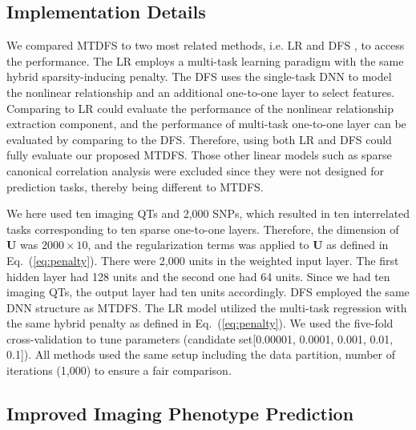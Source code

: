 \documentclass{llncs}
\begin{document}
\subsection{Implementation Details}

We compared MTDFS to two most related methods, i.e. LR \cite{wang2012bioinfo1} and DFS \cite{li2015}, to access the performance. The LR employs a multi-task learning paradigm with the same hybrid sparsity-inducing penalty. The DFS uses the single-task DNN to model the nonlinear relationship and an additional one-to-one layer to select features. Comparing to LR could evaluate the performance of the nonlinear relationship extraction component, and the performance of multi-task one-to-one layer can be evaluated by comparing to the DFS. Therefore, using both LR and DFS could fully evaluate our proposed MTDFS. Those other linear models such as sparse canonical correlation analysis \cite{du2020mia,fang2016joint,lin2013mia,yan2014eccb} were excluded since they were not designed for prediction tasks, thereby being different to MTDFS.

We here used ten imaging QTs and 2,000 SNPs, which resulted in ten interrelated tasks corresponding to ten sparse one-to-one layers. Therefore, the dimension of $\mathbf{U}$ was $2000 \times 10$, and the regularization terms was applied to $\mathbf{U}$ as defined in Eq.~(\ref{eq:penalty}). There were 2,000 units in the weighted input layer. The first hidden layer had 128 units and the second one had 64 units. Since we had ten imaging QTs, the output layer had ten units accordingly. DFS employed the same DNN structure as MTDFS. The LR model utilized the multi-task regression with the same hybrid penalty as defined in Eq.~(\ref{eq:penalty}). We used the five-fold cross-validation to tune parameters (candidate set[0.00001, 0.0001, 0.001, 0.01, 0.1]). All methods used the same setup including the data partition, number of iterations (1,000) to ensure a fair comparison.

\subsection{Improved Imaging Phenotype Prediction}
\end{document}

